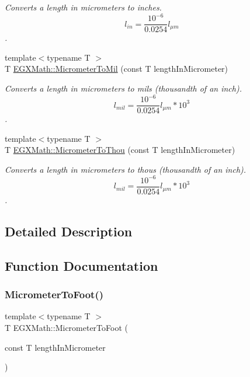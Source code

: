 \begin{DoxyCompactItemize}
\begin{DoxyCompactList}\small\item\em Converts a length in micrometers to inches. \[ l_{in}= \frac{10^{-6}}{0.0254} l_{\mu m} \]. \end{DoxyCompactList}\item 
{\footnotesize template$<$typename T $>$ }\\T \mbox{\hyperlink{group___e_g_x_math-_conversions-_length_conversions-_micrometer-_imperial_ga94d0f5a6ba598898a13e3a8837d7c681}{E\+G\+X\+Math\+::\+Micrometer\+To\+Mil}} (const T length\+In\+Micrometer)
\begin{DoxyCompactList}\small\item\em Converts a length in micrometers to mils (thousandth of an inch). \[ l_{mil}= \frac{10^{-6}}{0.0254} l_{\mu m} * 10^{3} \]. \end{DoxyCompactList}\item 
{\footnotesize template$<$typename T $>$ }\\T \mbox{\hyperlink{group___e_g_x_math-_conversions-_length_conversions-_micrometer-_imperial_ga8a2cfa132c629695ff469f66e1ab5919}{E\+G\+X\+Math\+::\+Micrometer\+To\+Thou}} (const T length\+In\+Micrometer)
\begin{DoxyCompactList}\small\item\em Converts a length in micrometers to thous (thousandth of an inch). \[ l_{mil}= \frac{10^{-6}}{0.0254} l_{\mu m} * 10^{3} \]. \end{DoxyCompactList}\end{DoxyCompactItemize}


\subsection{Detailed Description}


\subsection{Function Documentation}
\mbox{\label{group___e_g_x_math-_conversions-_length_conversions-_micrometer-_imperial_gaed71a8fede89b4bc87d3967e4d99c30d}} 
\subsubsection{\texorpdfstring{Micrometer\+To\+Foot()}{MicrometerToFoot()}}
{\footnotesize\ttfamily template$<$typename T $>$ \\
T E\+G\+X\+Math\+::\+Micrometer\+To\+Foot (\begin{DoxyParamCaption}\item[{const T}]{length\+In\+Micrometer }\end{DoxyParamCaption})}



